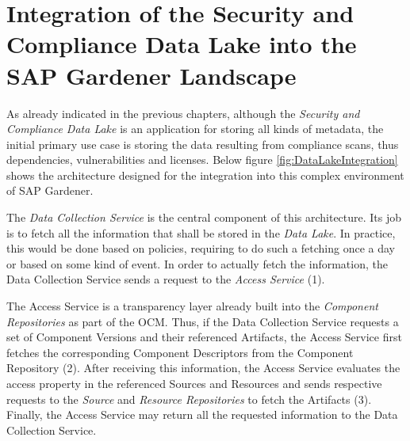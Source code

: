 \section{Integration of the Security and Compliance Data Lake into the SAP Gardener Landscape} \label{sec:Integration of the Security and Compliance Data Lake into the SAP Gardener Landscape}
As already indicated in the previous chapters, although the \emph{Security and Compliance Data Lake} is an application for storing all kinds of metadata, the initial primary use case is storing the data resulting from compliance scans, thus dependencies, vulnerabilities and licenses. Below figure \ref{fig:DataLakeIntegration} shows the architecture designed for the integration into this complex environment of SAP Gardener.\par 
The \emph{Data Collection Service} is the central component of this architecture. Its job is to fetch all the information that shall be stored in the \emph{Data Lake}. In practice, this would be done based on policies, requiring to do such a fetching once a day or based on some kind of event. In order to actually fetch the information, the Data Collection Service sends a request to the \emph{Access Service} (1).\par
The Access Service is a transparency layer already built into the \emph{Component Repositories} as part of the OCM. Thus, if the Data Collection Service requests a set of Component Versions and their referenced Artifacts, the Access Service first fetches the corresponding Component Descriptors from the Component Repository (2). After receiving this information, the Access Service evaluates the access property in the referenced Sources and Resources and sends respective requests to the \emph{Source} and \emph{Resource Repositories} to fetch the Artifacts (3). Finally, the Access Service may return all the requested information to the Data Collection Service.\par

